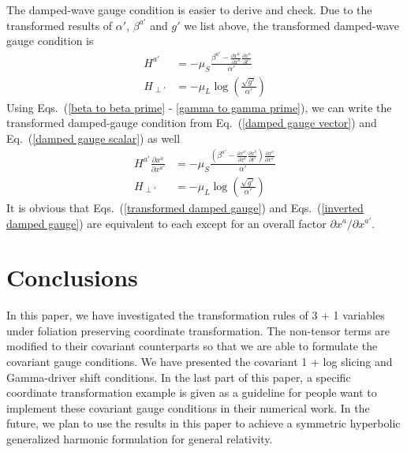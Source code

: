 The damped-wave gauge condition is easier to derive and check. Due to the transformed results of $\alpha'$, $\beta^{a'}$ and $g'$ we list above, the transformed damped-wave gauge condition is
\begin{subequations}\label{transformed damped gauge}
\begin{align}
H^{a'} & = -\mu_{S}\frac{\beta^{a'} - \frac{\partial x^{a'}}{\partial x^{a}}\frac{\partial x^{a}}{\partial t'}}{\alpha'}\\
H_{\perp'} & = -\mu_{L}\log\left(\frac{\sqrt{g'}}{\alpha'}\right)
\end{align}
\end{subequations}
Using Eqs.~(\ref{beta to beta prime} - \ref{gamma to gamma prime}), we can write the transformed damped-gauge condition from Eq.~(\ref{damped gauge vector}) and Eq.~(\ref{damped gauge scalar}) as well
\begin{subequations}\label{inverted damped gauge}
\begin{align}
H^{a'}\frac{\partial x^{a}}{\partial x^{a'}} & = - \mu_{S}\frac{\left( \beta^{a'} - \frac{\partial x^{a'}}{\partial x^{b}}\frac{\partial x^{b}}{\partial t'}\right)\frac{\partial x^{a}}{\partial x^{a'}}}{\alpha'}\\
H_{\perp'} & = - \mu_{L}\log\left(\frac{\sqrt{g'}}{\alpha'}\right)
\end{align}
\end{subequations}
It is obvious that Eqs.~(\ref{transformed damped gauge}) and Eqs.~(\ref{inverted damped gauge}) are equivalent to each except for an overall factor $\partial x^{a}/\partial x^{a'}$. 
\section{Conclusions}
In this paper, we have investigated the transformation rules of 3 + 1 variables under foliation preserving coordinate transformation. The non-tensor terms are modified to their covariant counterparts so that we are able to formulate the covariant gauge conditions. We have presented the covariant 1 + log slicing and Gamma-driver shift conditions. In the last part of this paper, a specific coordinate transformation example is given as a guideline for people want to implement these covariant gauge conditions in their numerical work. In the future, we plan to use the results in this paper to achieve a symmetric hyperbolic generalized harmonic formulation for general relativity.  

